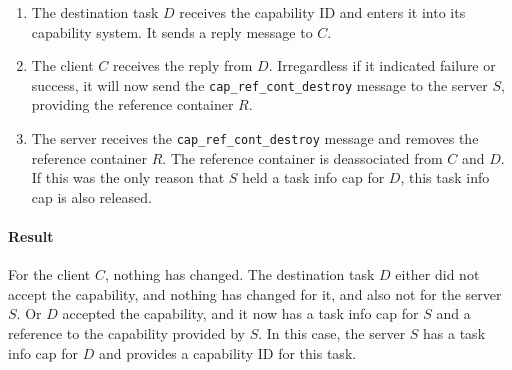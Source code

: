 \begin{enumerate}
\item The destination task $D$ receives the capability ID and enters
  it into its capability system.  It sends a reply message to $C$.

  \begin{comment}
    If the only purpose of the RPC was to copy the capability, the
    reply message can be empty.  Usually, capabilities will be
    transfered as part of a larger operation, though, and more work
    will be done by $D$ before returning to $C$.
  \end{comment}
  
\item \label{copycapout} The client $C$ receives the reply from $D$.
  Irregardless if it indicated failure or success, it will now send
  the \verb/cap_ref_cont_destroy/ message to the server $S$, providing
  the reference container $R$.

  \begin{comment}
    This message can be a simple message.  It does not require a reply
    from the server.
  \end{comment}
  
\item The server receives the \verb/cap_ref_cont_destroy/ message and
  removes the reference container $R$.  The reference container is
  deassociated from $C$ and $D$.  If this was the only reason that $S$
  held a task info cap for $D$, this task info cap is also released.

  \begin{comment}
    Because the reference container can not be deassociated from $C$
    by any other means than this interface, the client does not need
    to provide $D$.  $R$ can not be reused without the client $C$
    having it destroyed first.  This is different from the
    \verb/cap_ref_cont_accept/ call made by $D$, see above.
  \end{comment}

\end{enumerate}

\paragraph{Result}
For the client $C$, nothing has changed.  The destination task $D$
either did not accept the capability, and nothing has changed for it,
and also not for the server $S$.  Or $D$ accepted the capability, and
it now has a task info cap for $S$ and a reference to the capability
provided by $S$.  In this case, the server $S$ has a task info cap for
$D$ and provides a capability ID for this task.

